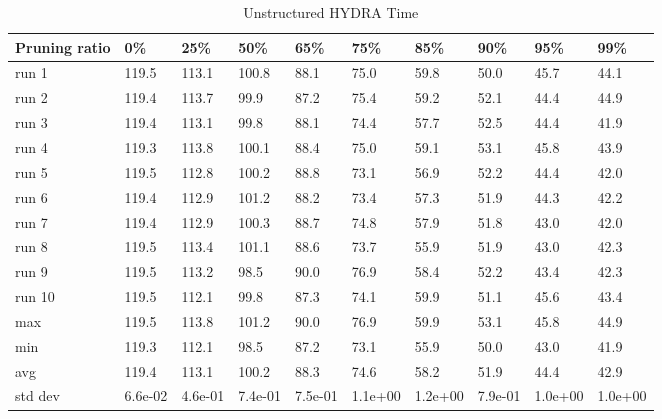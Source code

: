 \documentclass[journal,onecolumn,12pt]{IEEEtran}
\begin{document}
\begin{table}[htbp]
    \caption{Unstructured HYDRA Time}
    \begin{center}
    \begin{tabular}{ |p{2cm}|p{1cm}|p{1cm}|p{1cm}|p{1cm}|p{1cm}|p{1cm}|p{1cm}|p{1cm}|p{1cm}|  }
     \hline
     Pruning ratio  & 0\% & 25\%& 50\%& 65\%& 75\%& 85\%& 90\%& 95\%& 99\%\\
     \hline
     run 1&119.5&113.1&100.8&88.1&75.0&59.8&50.0&45.7&44.1\\
     run 2&119.4&113.7&99.9&87.2&75.4&59.2&52.1&44.4&44.9\\
     run 3&119.4&113.1&99.8&88.1&74.4&57.7&52.5&44.4&41.9\\
     run 4&119.3&113.8&100.1&88.4&75.0&59.1&53.1&45.8&43.9\\
     run 5&119.5&112.8&100.2&88.8&73.1&56.9&52.2&44.4&42.0\\
     run 6&119.4&112.9&101.2&88.2&73.4&57.3&51.9&44.3&42.2\\
     run 7&119.4&112.9&100.3&88.7&74.8&57.9&51.8&43.0&42.0\\
     run 8&119.5&113.4&101.1&88.6&73.7&55.9&51.9&43.0&42.3\\
     run 9&119.5&113.2&98.5&90.0&76.9&58.4&52.2&43.4&42.3\\
     run 10&119.5&112.1&99.8&87.3&74.1&59.9&51.1&45.6&43.4\\
     \hline
        max     &119.5&113.8&101.2&90.0&76.9&59.9&53.1&45.8&44.9\\
        min     &119.3&112.1&98.5&87.2&73.1&55.9&50.0&43.0&41.9\\
        avg     &119.4&113.1&100.2&88.3&74.6&58.2&51.9&44.4&42.9\\
        std dev &6.6e-02&4.6e-01&7.4e-01&7.5e-01&1.1e+00&1.2e+00&7.9e-01&1.0e+00&1.0e+00\\
     \hline
    \end{tabular}
    \end{center}
    \label{tab:a7}
\end{table}
\end{document}

